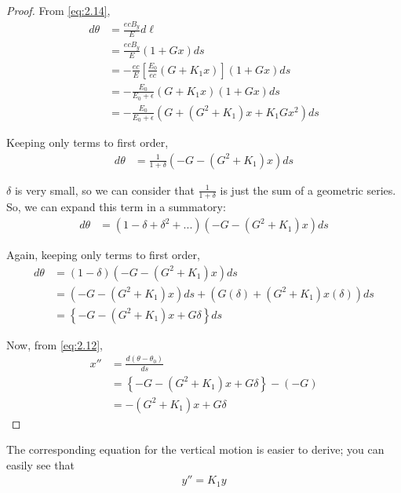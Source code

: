 \begin{proof}
	From \eqref{eq:2.14},
	\begin{align*}
		d\theta &= \frac{ecB_y}{E}d\ell\\
				&= \frac{ecB_y}{E}(1+Gx)ds\\
				&= -\frac{ec}{E}\left[\frac{E_0}{ec}(G+K_1x)\right](1+Gx)ds\\
				&= -\frac{E_0}{E_0+\epsilon}(G+K_1x)(1+Gx)ds\\
				&= -\frac{E_0}{E_0+\epsilon}(G+(G^2+K_1)x + K_1Gx^2)ds
	\end{align*}

    Keeping only terms to first order,
	\begin{align*}
		d\theta &= \frac{1}{1+\delta}(-G-(G^2+K_1)x)ds
	\end{align*}

	$\delta$ is very small, so we can consider that $\frac{1}{1+\delta}$ is just  the sum of a geometric series. So, we can expand this term in a summatory:
	\begin{align*}
		d\theta &= \left(1 - \delta + \delta^2+ ...\right)(-G-(G^2+K_1)x)ds
	\end{align*}

    Again, keeping only terms to first order,
	\begin{align*}
		d\theta &= \left(1 - \delta\right)(-G-(G^2+K_1)x)ds\\
				&= (-G-(G^2+K_1)x)ds + \left(G\left(\delta\right)+(G^2+K_1)x\left(\delta\right)\right)ds\\
				&= \left\{-G-(G^2+K_1)x + G\delta\right\}ds
	\end{align*}

	Now, from \eqref{eq:2.12},
	\begin{align*}
		x'' &= \frac{d(\theta-\theta_0)}{ds}\\
			&= \left\{-G-(G^2+K_1)x + G\delta\right\} - (-G)\\
			&= -(G^2+K_1)x + G\delta
	\end{align*}
\end{proof}

The corresponding equation for the vertical motion is easier to derive; you can easily see that
\begin{align}
	y'' = K_1 y
\end{align}

